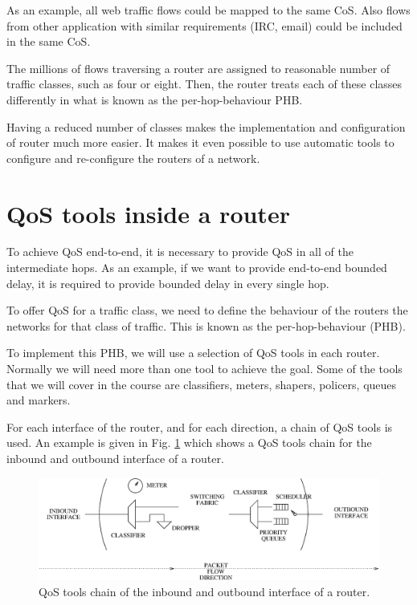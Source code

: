 As an example, all web traffic flows could be mapped to the same CoS.
Also flows from other application with similar requirements (IRC, email) could be included in the same CoS.

The millions of flows traversing a router are assigned to reasonable number of traffic classes, such as four or eight.
Then, the router treats each of these classes differently in what is known as the per-hop-behaviour PHB.

Having a reduced number of classes makes the implementation and configuration of router much more easier.
It makes it even possible to use automatic tools to configure and re-configure the routers of a network.

\section{QoS tools inside a router}

To achieve QoS end-to-end, it is necessary to provide QoS in all of the intermediate hops.
As an example, if we want to provide end-to-end bounded delay, it is required to provide  bounded delay in every single hop.

To offer QoS for a traffic class, we need to define the behaviour of the routers the networks for that class of traffic.
This is known as the per-hop-behaviour (PHB).

To implement this PHB, we will use a selection of QoS tools in each router.
Normally we will need more than one tool to achieve the goal.
Some of the tools that we will cover in the course are classifiers, meters, shapers, policers, queues and markers.

For each interface of the router, and for each direction, a chain of QoS tools is used.
An example is given in Fig. \ref{fig:qos-chain} which shows a QoS tools chain for the inbound and outbound interface of a router.

\begin{figure}[h]
\centering
\includegraphics[width=\linewidth]{figures/qos_chain.eps}
\caption{QoS tools chain of the inbound and outbound interface of a router.}
\label{fig:qos-chain}
\end{figure}

